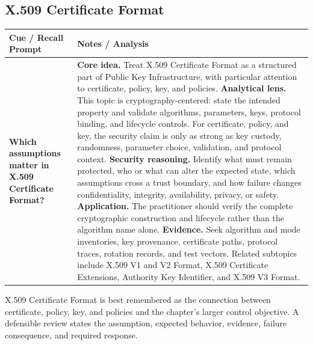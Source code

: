 \documentclass[11pt]{article}
\newcommand{\CornellHeader}{%
\rowcolor{Navy}\color{white}\bfseries Cue / Recall Prompt & \color{white}\bfseries Notes / Analysis\\\hline}
\newcommand{\CornellRow}[2]{%
\cellcolor{CueGray}\RaggedRight\textbf{#1} & \RaggedRight #2\\\hline}
\begin{document}
\subsection*{X.509 Certificate Format}
\begin{longtable}{>{\RaggedRight\arraybackslash}p{}|>{\RaggedRight\arraybackslash}p{}}
\CornellHeader
\CornellRow{Which assumptions matter in X.509 Certificate Format?}{\textbf{Core idea.} Treat X.509 Certificate Format as a structured part of Public Key Infrastructure, with particular attention to certificate, policy, key, and policies. \textbf{Analytical lens.} This topic is cryptography-centered: state the intended property and validate algorithms, parameters, keys, protocol binding, and lifecycle controls. For certificate, policy, and key, the security claim is only as strong as key custody, randomness, parameter choice, validation, and protocol context. \textbf{Security reasoning.} Identify what must remain protected, who or what can alter the expected state, which assumptions cross a trust boundary, and how failure changes confidentiality, integrity, availability, privacy, or safety. \textbf{Application.} The practitioner should verify the complete cryptographic construction and lifecycle rather than the algorithm name alone. \textbf{Evidence.} Seek algorithm and mode inventories, key provenance, certificate paths, protocol traces, rotation records, and test vectors. Related subtopics include X.509 V1 and V2 Format, X.509 Certificate Extensions, Authority Key Identifier, and X.509 V3 Format.}
\end{longtable}
\begin{topicsummary}
X.509 Certificate Format is best remembered as the connection between certificate, policy, key, and policies and the chapter's larger control objective. A defensible review states the assumption, expected behavior, evidence, failure consequence, and required response.
\end{topicsummary}
\end{document}
